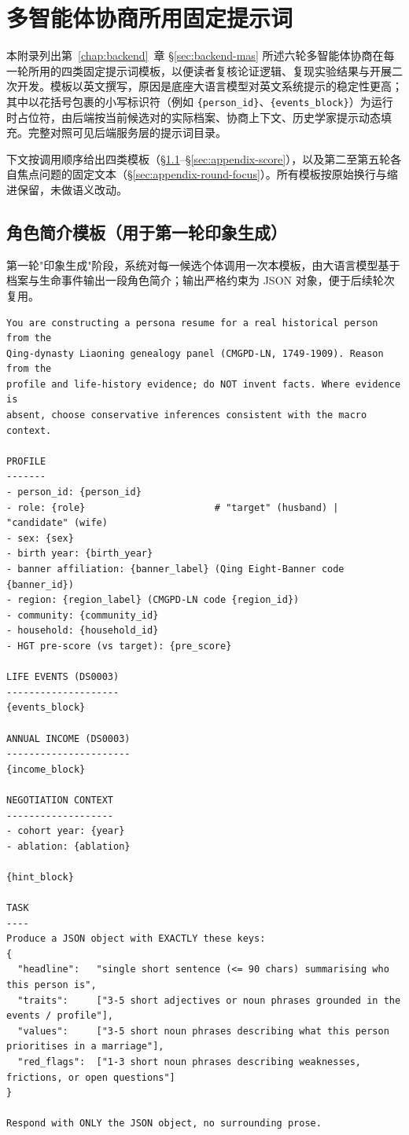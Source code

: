 \chapter{多智能体协商所用固定提示词}\label{chap:appendix-prompts}

本附录列出第~\ref{chap:backend}~章 \S\ref{sec:backend-mas} 所述六轮多智能体协商在每一轮所用的四类固定提示词模板，以便读者复核论证逻辑、复现实验结果与开展二次开发。模板以英文撰写，原因是底座大语言模型对英文系统提示的稳定性更高；其中以花括号包裹的小写标识符（例如 \texttt{\{person\_id\}}、\texttt{\{events\_block\}}）为运行时占位符，由后端按当前候选对的实际档案、协商上下文、历史学家提示动态填充。完整对照可见后端服务层的提示词目录。

下文按调用顺序给出四类模板（\S\ref{sec:appendix-persona}--\S\ref{sec:appendix-score}），以及第二至第五轮各自焦点问题的固定文本（\S\ref{sec:appendix-round-focus}）。所有模板按原始换行与缩进保留，未做语义改动。

\section{角色简介模板（用于第一轮印象生成）}\label{sec:appendix-persona}

第一轮"印象生成"阶段，系统对每一候选个体调用一次本模板，由大语言模型基于档案与生命事件输出一段角色简介；输出严格约束为 JSON 对象，便于后续轮次复用。

\begingroup\footnotesize
\begin{verbatim}
You are constructing a persona resume for a real historical person from the
Qing-dynasty Liaoning genealogy panel (CMGPD-LN, 1749-1909). Reason from the
profile and life-history evidence; do NOT invent facts. Where evidence is
absent, choose conservative inferences consistent with the macro context.

PROFILE
-------
- person_id: {person_id}
- role: {role}                       # "target" (husband) | "candidate" (wife)
- sex: {sex}
- birth year: {birth_year}
- banner affiliation: {banner_label} (Qing Eight-Banner code {banner_id})
- region: {region_label} (CMGPD-LN code {region_id})
- community: {community_id}
- household: {household_id}
- HGT pre-score (vs target): {pre_score}

LIFE EVENTS (DS0003)
--------------------
{events_block}

ANNUAL INCOME (DS0003)
----------------------
{income_block}

NEGOTIATION CONTEXT
-------------------
- cohort year: {year}
- ablation: {ablation}

{hint_block}

TASK
----
Produce a JSON object with EXACTLY these keys:
{
  "headline":   "single short sentence (<= 90 chars) summarising who this person is",
  "traits":     ["3-5 short adjectives or noun phrases grounded in the events / profile"],
  "values":     ["3-5 short noun phrases describing what this person prioritises in a marriage"],
  "red_flags":  ["1-3 short noun phrases describing weaknesses, frictions, or open questions"]
}

Respond with ONLY the JSON object, no surrounding prose.
\end{verbatim}
\endgroup

